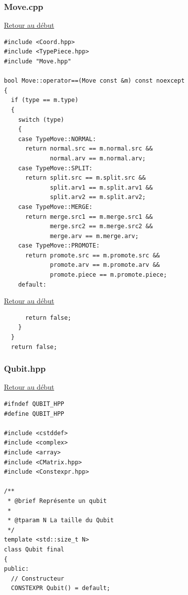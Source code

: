 {\begin{frame}[fragile]
\begin{verbatim}
\end{verbatim}
\end{frame}

\begin{frame}[fragile]
\label{Move.cpp}
\frametitle{Move.cpp}
\hyperlink{conclusion}{Retour au début}\newline
\begin{verbatim}
#include <Coord.hpp>
#include <TypePiece.hpp>
#include "Move.hpp"

bool Move::operator==(Move const &m) const noexcept
{
  if (type == m.type)
  {
    switch (type)
    {
    case TypeMove::NORMAL:
      return normal.src == m.normal.src &&
             normal.arv == m.normal.arv;
    case TypeMove::SPLIT:
      return split.src == m.split.src &&
             split.arv1 == m.split.arv1 &&
             split.arv2 == m.split.arv2;
    case TypeMove::MERGE:
      return merge.src1 == m.merge.src1 &&
             merge.src2 == m.merge.src2 &&
             merge.arv == m.merge.arv;
    case TypeMove::PROMOTE:
      return promote.src == m.promote.src &&
             promote.arv == m.promote.arv &&
             promote.piece == m.promote.piece;
    default:
\end{verbatim}
\end{frame}

\begin{frame}[fragile]
\hyperlink{conclusion}{Retour au début}\newline
\begin{verbatim}
      return false;
    }
  }
  return false;

\end{verbatim}
\end{frame}

\begin{frame}[fragile]
\label{Qubit.hpp}
\frametitle{Qubit.hpp}
\hyperlink{conclusion}{Retour au début}\newline
\begin{verbatim}
#ifndef QUBIT_HPP
#define QUBIT_HPP

#include <cstddef>
#include <complex>
#include <array>
#include <CMatrix.hpp>
#include <Constexpr.hpp>

/**
 * @brief Représente un qubit
 *
 * @tparam N La taille du Qubit
 */
template <std::size_t N>
class Qubit final
{
public:
  // Constructeur
  CONSTEXPR Qubit() = default;


\end{verbatim}
\end{frame}}
